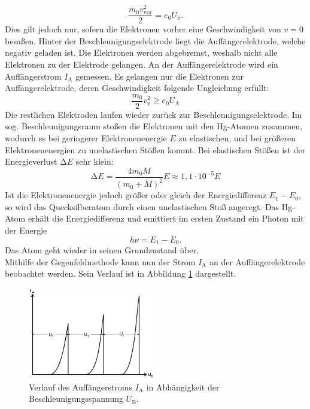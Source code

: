 \begin{equation}
	\frac{m_0 v^2_\text{vor}}{2} = e_0 U_\text{b} .
\end{equation}
Dies gilt jedoch nur, sofern die Elektronen vorher eine Geschwindigkeit von $v = 0$ besa{\ss}en. 
Hinter der Beschleunigungselektrode liegt die Auffängerelektrode, welche negativ geladen ist. Die Elektronen werden abgebremst, weshalb nicht alle Elektronen zu der Elektrode gelangen. An der Auffängerelektrode wird ein Auffängerstrom $I_\text{A}$ gemessen. Es gelangen nur die Elektronen zur Auffängerelektrode, deren Geschwindigkeit folgende Ungleichung erfüllt:
\begin{equation}
	\frac{m_0}{2}v_\text{z}^2 \geq e_0 U_\text{A}
\end{equation}
Die restlichen Elektroden laufen wieder zurück zur Beschleunigungselektrode. \*
Im sog. Beschleunigungsraum sto{\ss}en die Elektronen mit den Hg-Atomen zusammen, wodurch es bei geringerer Elektronenenergie $E$ zu elastischen, und bei grö{\ss}eren Elektronenenergien zu unelastischen Stö{\ss}en kommt. 
Bei elastischen Stö{\ss}en ist der Energieverlust $\increment E$ sehr klein:
\begin{equation}
	\increment E = \frac{4m_0 M}{(m_0 + M)^2} E \approx 1,1 \cdot 10^{-5} E
\end{equation}
Ist die Elektronenenergie jedoch größer oder gleich der Energiedifferenz $E_1 - E_0$, so wird das Quecksilberatom durch einen unelastischen Sto{\ss} angeregt. Das Hg-Atom erhält die Energiedifferenz und emittiert im ersten Zustand ein Photon mit der Energie
\begin{equation}
	h\nu = E_1 - E_0 .
\end{equation}
Das Atom geht wieder in seinen Grundzustand über. \\
Mithilfe der Gegenfeldmethode kann nun der Strom $I_\text{A}$ an der Auffängerelektrode beobachtet werden. Sein Verlauf ist in Abbildung \ref{fig:Verlauf} dargestellt.
\begin{figure}[H]
    \centering
    \includegraphics[height=4cm]{Theorie/Verlauf.pdf}
    \caption{Verlauf des Auffängerstroms $I_\text{A}$ in Abhängigkeit der Beschleunigungsspannung $U_\text{B}$.}
    \label{fig:Verlauf}
\end{figure}

